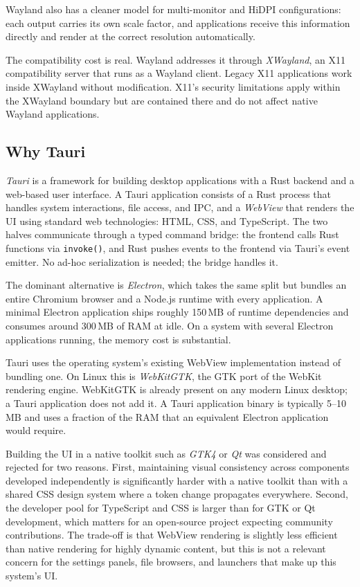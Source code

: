 Wayland also has a cleaner model for multi-monitor and HiDPI configurations:
each output carries its own scale factor, and applications receive this
information directly and render at the correct resolution automatically.

The compatibility cost is real. Wayland addresses it through \emph{XWayland},
an X11 compatibility server that runs as a Wayland client. Legacy X11
applications work inside XWayland without modification. X11's security
limitations apply within the XWayland boundary but are contained there and do
not affect native Wayland applications.

\subsection{Why Tauri}
\label{sec:tauri-intro}

\emph{Tauri} is a framework for building desktop applications with a Rust
backend and a web-based user interface. A Tauri application consists of a Rust
process that handles system interactions, file access, and IPC, and a
\emph{WebView} that renders the UI using standard web technologies: HTML, CSS,
and TypeScript. The two halves communicate through a typed command bridge: the
frontend calls Rust functions via \texttt{invoke()}, and Rust pushes events to
the frontend via Tauri's event emitter. No ad-hoc serialization is needed; the
bridge handles it.

The dominant alternative is \emph{Electron}, which takes the same split but
bundles an entire Chromium browser and a Node.js runtime with every application.
A minimal Electron application ships roughly 150\,MB of runtime dependencies and
consumes around 300\,MB of RAM at idle. On a system with several Electron
applications running, the memory cost is substantial.

Tauri uses the operating system's existing WebView implementation instead of
bundling one. On Linux this is \emph{WebKitGTK}, the GTK port of the WebKit
rendering engine. WebKitGTK is already present on any modern Linux desktop; a
Tauri application does not add it. A Tauri application binary is typically
5--10\,MB and uses a fraction of the RAM that an equivalent Electron application
would require.

Building the UI in a native toolkit such as \emph{GTK4} or \emph{Qt} was
considered and rejected for two reasons. First, maintaining visual consistency
across components developed independently is significantly harder with a native
toolkit than with a shared CSS design system where a token change propagates
everywhere. Second, the developer pool for TypeScript and CSS is larger than
for GTK or Qt development, which matters for an open-source project expecting
community contributions. The trade-off is that WebView rendering is slightly
less efficient than native rendering for highly dynamic content, but this is not
a relevant concern for the settings panels, file browsers, and launchers that
make up this system's UI.

